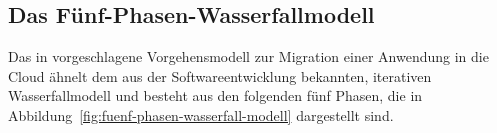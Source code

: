 \subsection{Das Fünf-Phasen-Wasserfallmodell}
\label{cha:five_phases}
Das in  vorgeschlagene Vorgehensmodell zur Migration
einer Anwendung in die Cloud ähnelt dem aus der
Softwareentwicklung bekannten, iterativen Wasserfallmodell und besteht aus den
folgenden fünf Phasen, die in Abbildung~\ref{fig:fuenf-phasen-wasserfall-modell}
dargestellt sind. 

